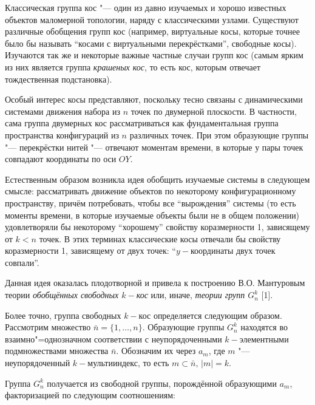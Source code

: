 \vzmscaption

Классическая группа кос "--- один из давно изучаемых и хорошо известных объектов маломерной топологии, наряду с классическими узлами. Существуют различные обобщения групп кос (например, виртуальные косы, которые точнее было бы называть ``косами с виртуальными перекрёстками'', свободные косы). Изучаются так же и некоторые важные частные случаи групп кос (самым ярким из них является группа {\em крашеных кос}, то есть кос, которым отвечает тождественная подстановка).

Особый интерес косы представляют, поскольку тесно связаны с динамическими системами движения набора из $n$ точек по двумерной плоскости. В частности, сама группа двумерных кос рассматриваться как фундаментальная группа пространства конфигураций из $n$ различных точек. При этом образующие группы "--- перекрёстки нитей "--- отвечают моментам времени, в которые у пары точек совпадают координаты по оси $OY$.

Естественным образом возникла идея обобщить изучаемые системы в следующем смысле: рассматривать движение объектов по некоторому конфигурационному пространству, причём потребовать, чтобы все ``вырождения'' системы (то есть моменты времени, в которые изучаемые объекты были не в общем положении) удовлетворяли бы некоторому ``хорошему'' свойству коразмерности 1, зависящему от $k<n$ точек. В этих терминах классические косы отвечали бы свойству коразмерности 1, зависящему от двух точек: ``$y-$координаты двух точек совпали''.

Данная идея оказалась плодотворной и привела к построению В.О. Мантуровым теории {\em обобщённых свободных $k-$кос} или, иначе, {\em теории групп $G_n^k$} [1].

Более точно, группа свободных $k-$кос определяется следующим образом. Рассмотрим множество $\bar{n}=\{1,\dots, n\}$. Образующие группы $G_n^k$ находятся во взаимно"=однозначном соответствии с неупорядоченными $k-$элементными подмножествами множества $\bar{n}$. Обозначим их через $a_m$, где $m$ "--- неупорядоченный $k-$мультииндекс, то есть $m\subset \bar{n}, \, |m|=k$.

Группа $G_n^k$ получается из свободной группы, порождённой образующими $a_m$, факторизацией по следующим соотношениям:

